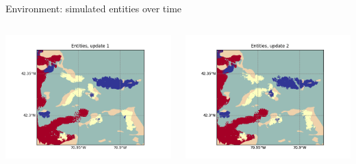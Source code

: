 \documentclass[9pt,xcolor=table]{beamer}
\begin{document}
\begin{frame}{Environment: simulated entities over time}
    \begin{columns}
        \begin{column}{0.5\textwidth}
            \includegraphics[width=\textwidth,trim={0cm 0cm 0cm 0cm},clip]{img/e1.png}
        \end{column}
        \begin{column}{0.5\textwidth}
            \includegraphics[width=\textwidth,trim={0cm 0cm 0cm 0cm},clip]{img/e2.png}
        \end{column}
    \end{columns}
    \begin{columns}
        \begin{column}{0.5\textwidth}

\end{column}
\end{columns}
\end{frame}
\end{document}
